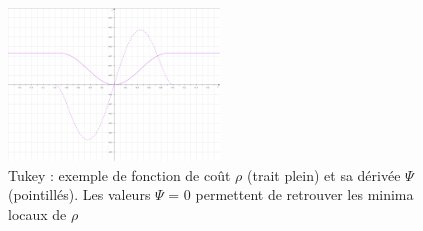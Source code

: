 \begin{figure} 
	\centering
	\includegraphics[width=0.5\textwidth]{Chapter4/graphics/tukey_functions.png}
	\caption{Tukey : exemple de fonction de coût $\rho$ (trait plein) et sa dérivée $\Psi$ (pointillés). Les valeurs $\Psi$ = 0 permettent de retrouver les minima locaux de $\rho$}
	\label{fig:ch4_ml_metric_derivatives}
\end{figure}
\clearpage 
